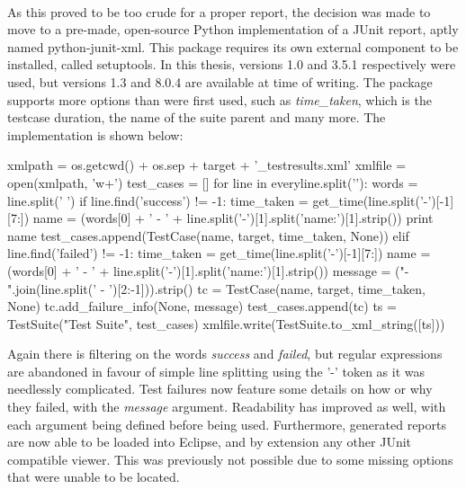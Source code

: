 \documentclass[11pt,british]{article}
\begin{document}
\\
As this proved to be too crude for a proper report, the decision was made to move to a pre-made, open-source Python implementation of a JUnit report, aptly named python-junit-xml.\cite{junitxml} This package requires its own external component to be installed, called setuptools.\cite{setuptools} In this thesis, versions 1.0 and 3.5.1 respectively were used, but versions 1.3 and 8.0.4 are available at time of writing. The package supports more options than were first used, such as \emph{time\_taken}, which is the testcase duration, the name of the suite parent and many more. The implementation is shown below:
\begin{python}
xmlpath = os.getcwd() + os.sep + target + '_testresults.xml'
xmlfile = open(xmlpath, 'w+')
test_cases = []
for line in everyline.split('\n'):
	words = line.split(' ')
	if line.find('success') != -1:
		time_taken = get_time(line.split('-')[-1][7:])
		name = (words[0] + ' - ' 
						 + line.split('-')[1].split('name:')[1].strip())
		print name
		test_cases.append(TestCase(name, target, time_taken, None))
	elif line.find('failed') != -1:
		time_taken = get_time(line.split('-')[-1][7:])
		name = (words[0] + ' - ' 
						 + line.split('-')[1].split('name:')[1].strip())
		message = ("-".join(line.split(' - ')[2:-1])).strip()
		tc = TestCase(name, target, time_taken, None)
		tc.add_failure_info(None, message)
		test_cases.append(tc)
ts = TestSuite("Test Suite", test_cases)
xmlfile.write(TestSuite.to_xml_string([ts]))
\end{python}
Again there is filtering on the words \emph{success} and \emph{failed}, but regular expressions are abandoned in favour of simple line splitting using the '-' token as it was needlessly complicated. Test failures now feature some details on how or why they failed, with the \emph{message} argument. Readability has improved as well, with each argument being defined before being used. Furthermore, generated reports are now able to be loaded into Eclipse, and by extension any other JUnit compatible viewer. This was previously not possible due to some missing options that were unable to be located.
\end{document}
